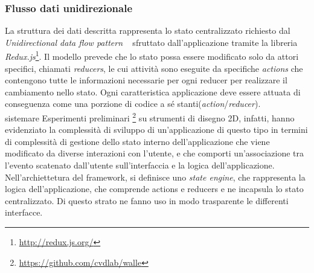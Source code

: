 \subsubsection*{Flusso dati unidirezionale}
\noindent
La struttura dei dati descritta rappresenta lo stato centralizzato richiesto dal \emph{Unidirectional data flow pattern}
~\cite{uniflow} sfruttato dall'applicazione tramite la libreria \emph{Redux.js}\footnote{\url{http://redux.js.org/}}.
Il modello prevede che lo stato possa essere modificato solo da attori specifici, chiamati \emph{reducers},
le cui attività sono eseguite da specifiche \emph{actions} che contengono tutte le informazioni necessarie per
ogni reducer per realizzare il cambiamento nello stato. Ogni caratteristica applicazione deve essere attuata di conseguenza
come una porzione di codice a sé stanti(\emph{action}/\emph{reducer}).\\ sistemare
Esperimenti preliminari
\footnote{\url{https://github.com/cvdlab/walle}} su strumenti di disegno 2D, infatti,
hanno evidenziato la complessità di sviluppo di un'applicazione di questo tipo in termini di complessità di gestione
dello stato interno dell'applicazione che viene modificato da diverse interazioni con l'utente,
e che comporti un'associazione tra l'evento scatenato dall'utente sull'interfaccia e la logica dell'applicazione.
Nell'archiettetura del framework, si definisce uno \emph{state engine}, che rappresenta la logica dell'applicazione,
che comprende actions e reducers e ne incapsula lo stato centralizzato.
Di questo strato ne fanno uso in modo trasparente le differenti interfacce.
\newpage

